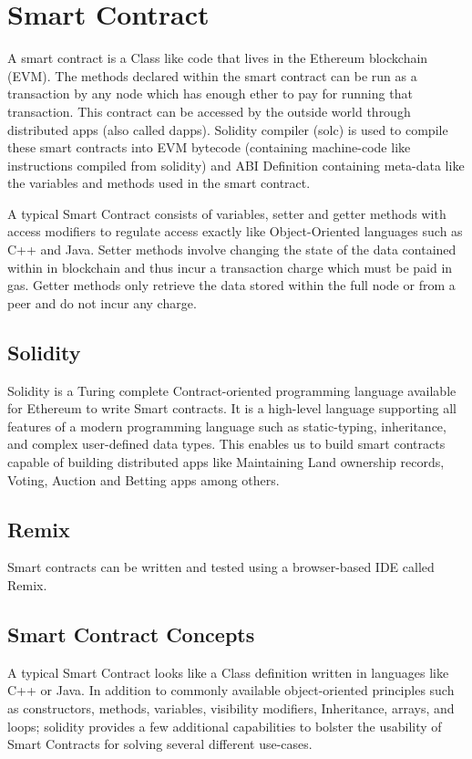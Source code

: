 \documentclass[11pt,openright]{report}
\begin{document}
\section{Smart Contract}
A smart contract is a Class like code that lives in the Ethereum blockchain (EVM). The methods declared within the smart contract can be run as a transaction by any node which has enough ether to pay for running that transaction. This contract can be accessed by the outside world through distributed apps (also called dapps). Solidity compiler (solc) is used to compile these smart contracts into EVM bytecode (containing machine-code like instructions compiled from solidity) and ABI Definition containing meta-data like the variables and methods used in the smart contract.

A typical Smart Contract consists of variables, setter and getter methods with access modifiers to regulate access exactly like Object-Oriented languages such as C++ and Java. Setter methods involve changing the state of the data contained within in blockchain and thus incur a transaction charge which must be paid in gas. Getter methods only retrieve the data stored within the full node or from a peer and do not incur any charge.

\subsection{Solidity}
Solidity is a Turing complete Contract-oriented programming language available for Ethereum to write Smart contracts. It is a high-level language supporting all features of a modern programming language such as static-typing, inheritance, and complex user-defined data types. This enables us to build smart contracts capable of building distributed apps like Maintaining Land ownership records, Voting, Auction and Betting apps among others.

\subsection{Remix}
Smart contracts can be written and tested using a browser-based IDE called Remix.

\subsection{Smart Contract Concepts}
A typical Smart Contract looks like a Class definition written in languages like C++ or Java. In addition to commonly available object-oriented principles such as constructors, methods, variables, visibility modifiers, Inheritance, arrays, and loops; solidity provides a few additional capabilities to bolster the usability of Smart Contracts for solving several different use-cases.
\end{document}
